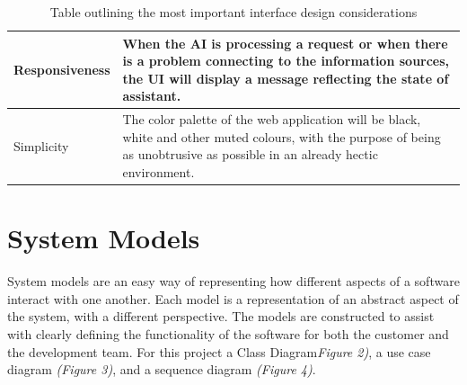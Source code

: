 \documentclass[]{IEEEtran}
\begin{document}
\begin{table}[h]
\begin{tabular}{| m{2cm} | m{5.5cm} | }
		\hline
		
		Responsiveness & When the AI is processing a request or when there is a problem connecting to the information sources, the UI will display a message reflecting the state of assistant. \\
		
		\hline 
		
		Simplicity & The color palette of the web application will be black, white and other muted colours, with the purpose of being as unobtrusive as possible in an already hectic environment. \\
		
		\hline
		
	
	\end{tabular}
		\caption{Table outlining the most important interface design considerations}
	
	\end{table}
	
	\section{System Models}
	
	System models are an easy way of representing how different aspects of a software interact with one another. Each model is a representation of an abstract aspect of the system, with a different perspective. The models are constructed to assist with clearly defining the functionality of the software for both the customer and the development team. For this project a Class Diagram\textit{Figure 2)}, a use case diagram \textit{(Figure 3)}, and a sequence diagram \textit{(Figure 4)}.
	
\end{document}
